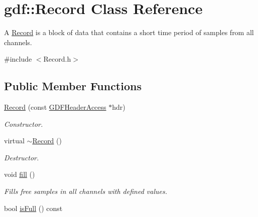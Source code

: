 \hypertarget{classgdf_1_1_record}{
\section{gdf::Record Class Reference}
\label{classgdf_1_1_record}
}


A \hyperlink{classgdf_1_1_record}{Record} is a block of data that contains a short time period of samples from all channels.  




{\ttfamily \#include $<$Record.h$>$}

\subsection*{Public Member Functions}
\begin{DoxyCompactItemize}
\item 
\hypertarget{classgdf_1_1_record_a708b6ae308bd5ebcf926fb0b78ea5242}{
\hyperlink{classgdf_1_1_record_a708b6ae308bd5ebcf926fb0b78ea5242}{Record} (const \hyperlink{classgdf_1_1_g_d_f_header_access}{GDFHeaderAccess} $\ast$hdr)}
\label{classgdf_1_1_record_a708b6ae308bd5ebcf926fb0b78ea5242}

\begin{DoxyCompactList}\small\item\em Constructor. \item\end{DoxyCompactList}\item 
\hypertarget{classgdf_1_1_record_a75d06616e1835c005bacd36451d7c23a}{
virtual \hyperlink{classgdf_1_1_record_a75d06616e1835c005bacd36451d7c23a}{$\sim$Record} ()}
\label{classgdf_1_1_record_a75d06616e1835c005bacd36451d7c23a}

\begin{DoxyCompactList}\small\item\em Destructor. \item\end{DoxyCompactList}\item 
void \hyperlink{classgdf_1_1_record_ae3a20e7fb29218efb793a8440688bfa6}{fill} ()
\begin{DoxyCompactList}\small\item\em Fills free samples in all channels with defined values. \item\end{DoxyCompactList}\item 
\hypertarget{classgdf_1_1_record_af5575c0f504c59507bb8e4d472edf5a7}{
bool \hyperlink{classgdf_1_1_record_af5575c0f504c59507bb8e4d472edf5a7}{isFull} () const }
\label{classgdf_1_1_record_af5575c0f504c59507bb8e4d472edf5a7}


\end{DoxyCompactItemize}
